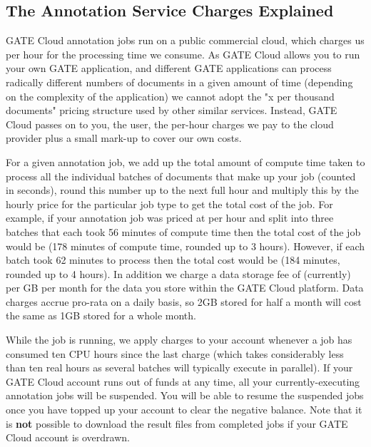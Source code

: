 \subsection{The Annotation Service Charges Explained}

GATE Cloud annotation jobs run on a public commercial cloud, 
which charges us per hour
for the processing time we consume.  As GATE Cloud allows you to run your
own GATE application, and different GATE applications can process radically
different numbers of documents in a given amount of time (depending on the
complexity of the application) we cannot adopt the "\textsterling x per thousand
documents" pricing structure used by other similar services.  Instead,
GATE Cloud passes on to you, the user, the per-hour charges we pay to the
cloud provider plus a small mark-up to cover our own costs.

For a given annotation job, we add up the total amount of compute time taken to
process all the individual batches of documents that make up your job (counted
in seconds), round this number up to the next full hour and multiply this by
the hourly price for the particular job type to get the total cost of the job.
For example, if your annotation job was priced at  per hour and split into
three batches that each took 56 minutes of compute time then the total cost of
the job would be  (178 minutes of compute time, rounded up to 3 hours).
However, if each batch took 62 minutes to process then the total cost would be
 (184 minutes, rounded up to 4 hours).  In addition we charge
a data storage fee of (currently)  per GB per month for the
data you store within the GATE Cloud platform.  Data charges accrue pro-rata on
a daily basis, so 2GB stored for half a month will cost the same as 1GB stored
for a whole month.

While the job is running, we apply charges to your account whenever a job has
consumed ten CPU hours since the last charge (which takes considerably less
than ten real hours as several batches will typically execute in parallel).  If
your GATE Cloud account runs out of funds at any time, all your
currently-executing annotation jobs will be suspended.  You will be able to
resume the suspended jobs once you have topped up your account to clear the
negative balance.  Note that it is {\bf not} possible to download the result files
from completed jobs if your GATE Cloud account is overdrawn.

